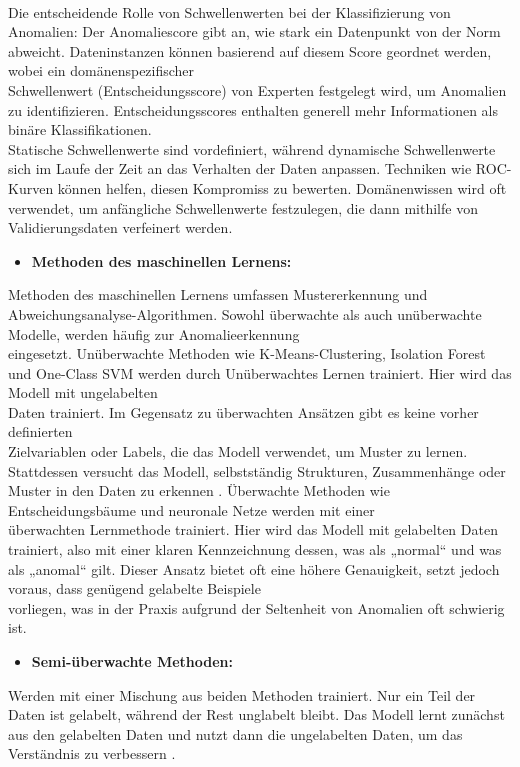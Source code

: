 \\
\nAbsatz
Die entscheidende Rolle von Schwellenwerten bei der Klassifizierung von Anomalien:
\nAbsatz
Der Anomaliescore gibt an, wie stark ein Datenpunkt von der Norm abweicht. Dateninstanzen können basierend auf diesem Score geordnet werden, wobei ein domänenspezifischer \\ Schwellenwert (Entscheidungsscore) von Experten festgelegt wird, um Anomalien zu identifizieren. Entscheidungsscores enthalten generell mehr Informationen als binäre Klassifikationen. \\ Statische Schwellenwerte sind vordefiniert, während dynamische Schwellenwerte sich im Laufe der Zeit an das Verhalten der Daten anpassen. Techniken wie ROC-Kurven können helfen, diesen Kompromiss zu bewerten. Domänenwissen wird oft verwendet, um anfängliche Schwellenwerte festzulegen, die dann mithilfe von Validierungsdaten verfeinert werden\cite{Preprocessing}.
\newpage
\begin{itemize} \item \textbf{Methoden des maschinellen Lernens:} \end{itemize} Methoden des maschinellen Lernens umfassen Mustererkennung und Abweichungsanalyse-Algorithmen. Sowohl überwachte als auch unüberwachte Modelle, werden häufig zur Anomalieerkennung \\ eingesetzt.
Unüberwachte Methoden wie K-Means-Clustering, Isolation Forest und One-Class SVM werden durch Unüberwachtes Lernen trainiert. Hier wird das Modell mit ungelabelten \\ Daten trainiert. Im Gegensatz zu überwachten Ansätzen gibt es keine vorher definierten \\ Zielvariablen oder Labels, die das Modell verwendet, um Muster zu lernen. Stattdessen versucht das Modell, selbstständig Strukturen, Zusammenhänge oder Muster in den Daten zu erkennen\cite{Lernen} \cite{ML}. Überwachte Methoden wie Entscheidungsbäume und neuronale Netze werden mit einer \\ überwachten Lernmethode trainiert. Hier wird das Modell mit gelabelten Daten trainiert, also mit einer klaren Kennzeichnung dessen, was als „normal“ und was als „anomal“ gilt. Dieser Ansatz bietet oft eine höhere Genauigkeit, setzt jedoch voraus, dass genügend gelabelte Beispiele \\ vorliegen, was in der Praxis aufgrund der Seltenheit von Anomalien oft schwierig ist\cite{Lernen}. \\
\begin{itemize} \item \textbf{Semi-überwachte Methoden:}\end{itemize} Werden mit einer Mischung aus beiden Methoden trainiert. Nur ein Teil der Daten ist gelabelt, während der Rest unglabelt bleibt. Das Modell lernt zunächst aus den gelabelten Daten und nutzt dann die ungelabelten Daten, um das Verständnis zu verbessern\cite{Lernen} \cite{LOF}.

